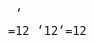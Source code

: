 \def\q{\par\begingroup\tt
\obeylines \catcode`\\=12
\catcode`{12\catcode`}=12
\obeyspaces\jobname
\endgroup}\q\bye